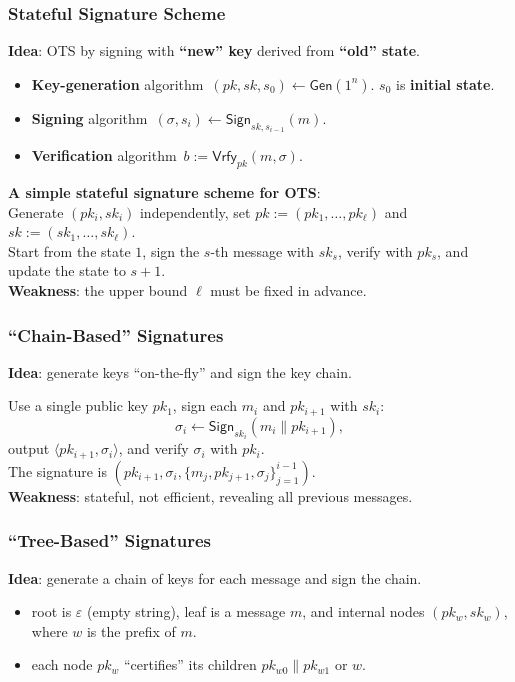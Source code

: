 \begin{frame}\frametitle{Stateful Signature Scheme}
\textbf{Idea}: OTS by signing with \textbf{``new'' key} derived from \textbf{``old'' state}. 
\begin{definition}
\begin{itemize}
\item \textbf{Key-generation} algorithm~$(pk,sk,s_0) \gets \mathsf{Gen}(1^n)$. $s_0$ is \textbf{initial state}.
\item \textbf{Signing} algorithm~$(\sigma,s_i) \gets \mathsf{Sign}_{sk,s_{i-1}}(m)$.
\item \textbf{Verification} algorithm~$b:= \mathsf{Vrfy}_{pk}(m,\sigma)$.
\end{itemize}
\end{definition}
\textbf{A simple stateful signature scheme for OTS}:\\
Generate $(pk_i,sk_i)$ independently, set $pk := (pk_1,\dotsc,pk_{\ell})$ and $sk := (sk_1,\dotsc,sk_{\ell})$. \\
Start from the state $1$, sign the $s$-th message with $sk_s$, verify with $pk_s$, and update the state to $s+1$.\\
\textbf{Weakness}: the upper bound $\ell$ must be fixed in advance.
\end{frame}
\begin{frame}\frametitle{``Chain-Based'' Signatures}
\textbf{Idea}: generate keys ``on-the-fly'' and sign the key chain.
\begin{figure}
\begin{center}

\end{center}
\end{figure}
Use a single public key $pk_1$, sign each $m_i$ and $pk_{i+1}$ with $sk_i$: \[\sigma_i \gets \mathsf{Sign}_{sk_i}(m_i\| pk_{i+1}),\] output $\langle pk_{i+1},\sigma_i \rangle$, and verify $\sigma_i$ with $pk_i$.\\
The signature is $(pk_{i+1},\sigma_i,\{m_j,pk_{j+1},\sigma_j\}^{i-1}_{j=1})$.\\
\textbf{Weakness}: stateful, not efficient, revealing all previous messages.
\end{frame}
\begin{frame}\frametitle{``Tree-Based'' Signatures}
\textbf{Idea}: generate a chain of keys for each message and sign the chain.
\begin{figure}
\begin{center}

\end{center}
\end{figure}
\begin{itemize}
\item root is $\varepsilon$ (empty string), leaf is a message $m$, and internal nodes $(pk_w,sk_w)$, where $w$ is the prefix of $m$.
\item each node $pk_w$ ``certifies'' its children $pk_{w0}\| pk_{w1}$ or $w$.
\end{itemize}
\end{frame}


